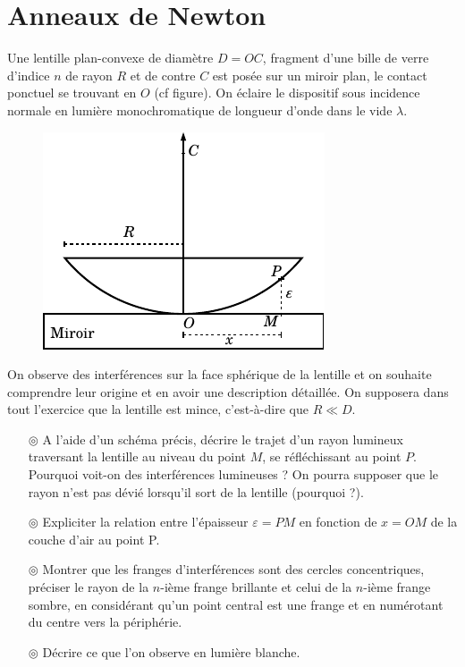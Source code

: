 \documentclass{report}
\begin{document}
\section*{Anneaux de Newton}

Une lentille plan-convexe de diamètre $D=OC$, fragment d'une bille de verre d'indice $n$ de rayon $R$ et de contre $C$ est posée sur un miroir plan, le contact ponctuel se trouvant en $O$ (cf figure). On éclaire le dispositif sous incidence normale en lumière monochromatique de longueur d'onde dans le vide $\lambda$.

\begin{figure}[h]
\centering
  \includegraphics[scale=1.2]{newton.pdf}
\end{figure}

On observe des interférences sur la face sphérique de la lentille et on souhaite comprendre leur origine et en avoir une description détaillée. On supposera dans tout l'exercice que la lentille est mince, c'est-à-dire que $R\ll D$. 

\begin{itemize}

	\item[$\circledcirc$] A l'aide d'un schéma précis, décrire le trajet d'un rayon lumineux traversant la lentille au niveau du point $M$, se réfléchissant au point $P$. Pourquoi voit-on des interférences lumineuses ? On pourra supposer que le rayon n'est pas dévié lorsqu'il sort de la lentille (pourquoi ?).
	
	\item[$\circledcirc$] Expliciter la relation entre l'épaisseur $\varepsilon=PM$ en fonction de $x=OM$ de la couche d'air au point P. 
	
	\item[$\circledcirc$] Montrer que les franges d'interférences sont des cercles concentriques, préciser le rayon de la $n$-ième frange brillante et celui de la $n$-ième frange sombre, en considérant qu'un point central est une frange et en numérotant du centre vers la périphérie.
	
	\item[$\circledcirc$] Décrire ce que l'on observe en lumière blanche.

\end{itemize}
\end{document}
